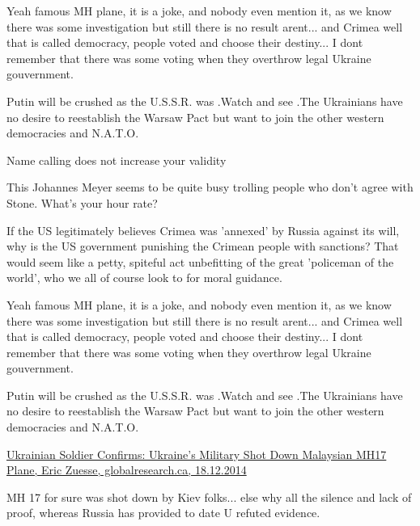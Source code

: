 \begin{itemize}
\begin{itemize}

Yeah famous MH plane, it is a joke, and nobody even mention it, as we know
there was some investigation but still there is no result arent... and Crimea
well that is called democracy, people voted and choose their destiny... I dont
remember that there was some voting when they overthrow legal Ukraine
gouvernment.


Putin will be crushed as the U.S.S.R. was .Watch and see .The Ukrainians have
no desire to reestablish the Warsaw Pact but want to join the other western
democracies and N.A.T.O.

Name calling does not increase your validity

This Johannes Meyer seems to be quite busy trolling people who don't agree with Stone. What's your hour rate?


If the US legitimately believes Crimea was 'annexed' by Russia against its
will, why is the US government punishing the Crimean people with sanctions?
That would seem like a petty, spiteful act unbefitting of the great 'policeman
of the world', who we all of course look to for moral guidance.


Yeah famous MH plane, it is a joke, and nobody even mention it, as we know
there was some investigation but still there is no result arent... and Crimea
well that is called democracy, people voted and choose their destiny... I dont
remember that there was some voting when they overthrow legal Ukraine
gouvernment.


Putin will be crushed as the U.S.S.R. was .Watch and see .The Ukrainians have
no desire to reestablish the Warsaw Pact but want to join the other western
democracies and N.A.T.O.

\href{https://www.globalresearch.ca/ukrainian-soldier-confirms-ukraines-military-shot-down-malaysian-mh17-plane/5420559}{%
Ukrainian Soldier Confirms: Ukraine’s Military Shot Down Malaysian MH17 Plane, Eric Zuesse, globalresearch.ca, 18.12.2014%
}


MH 17 for sure was shot down by Kiev folks... else why all the silence and lack
of proof, whereas Russia has provided to date U refuted evidence.


\end{itemize}
\end{itemize}
